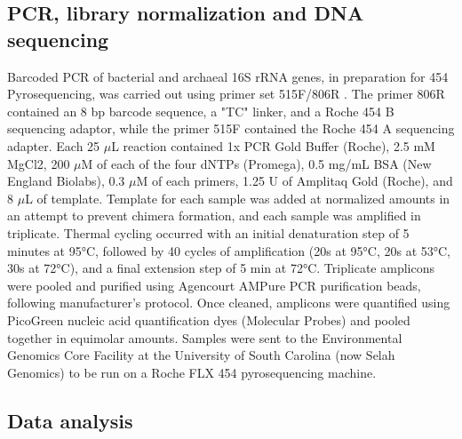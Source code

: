 \subsection{PCR, library normalization and DNA sequencing}
Barcoded PCR of bacterial and archaeal 16S rRNA genes, in preparation for 454
Pyrosequencing, was carried out using primer set 515F/806R \citep{21349862}.
The primer 806R contained an 8 bp barcode sequence, a "TC" linker, and a Roche
454 B sequencing adaptor, while the primer 515F contained the Roche 454 A
sequencing adapter. Each 25 $\mu$L reaction contained 1x PCR Gold Buffer
(Roche), 2.5 mM MgCl2, 200 $\mu$M of each of the four dNTPs (Promega), 0.5
mg/mL BSA (New England Biolabs), 0.3 $\mu$M of each primers, 1.25 U of Amplitaq
Gold (Roche), and 8 $\mu$L of template. Template for each sample was added at
normalized amounts in an attempt to prevent chimera formation, and each sample
was amplified in triplicate. Thermal cycling occurred with an initial
denaturation step of 5 minutes at 95°C, followed by 40 cycles of amplification
(20s at 95°C, 20s at 53°C, 30s at 72°C), and a final extension step of 5 min at
72°C. Triplicate amplicons were pooled and purified using Agencourt AMPure PCR
purification beads, following manufacturer’s protocol. Once cleaned, amplicons
were quantified using PicoGreen nucleic acid quantification dyes (Molecular
Probes) and pooled together in equimolar amounts. Samples were sent to the
Environmental Genomics Core Facility at the University of South Carolina (now
Selah Genomics) to be run on a Roche FLX 454 pyrosequencing machine. 

\subsection{Data analysis} 

